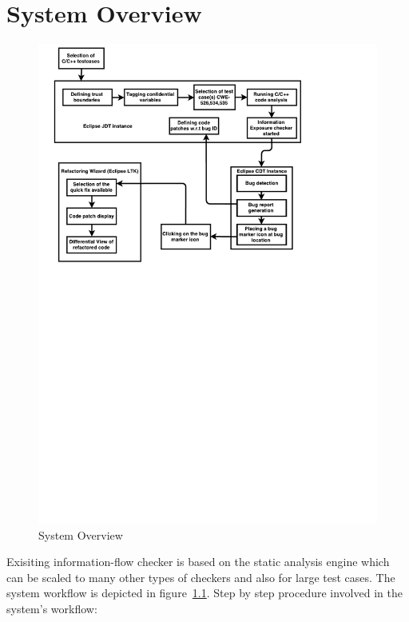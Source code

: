 \let\cleardoublepage\clearpage
\chapter{System Overview}
\begin{figure}[!htb]
\centering
\includegraphics[trim=0.0cm 0.0cm 0.0cm 0.0cm, scale=0.9]{pdf/system.pdf}
\vspace{-15.5cm}
\caption{System Overview}
\label{fig:system}
\end{figure}
Exisiting information-flow checker is based on the static analysis engine
which can be scaled to many other types of checkers and also for large 
test cases. The system workflow is depicted in figure~\ref{fig:system}.
Step by step procedure involved in the system's workflow:
